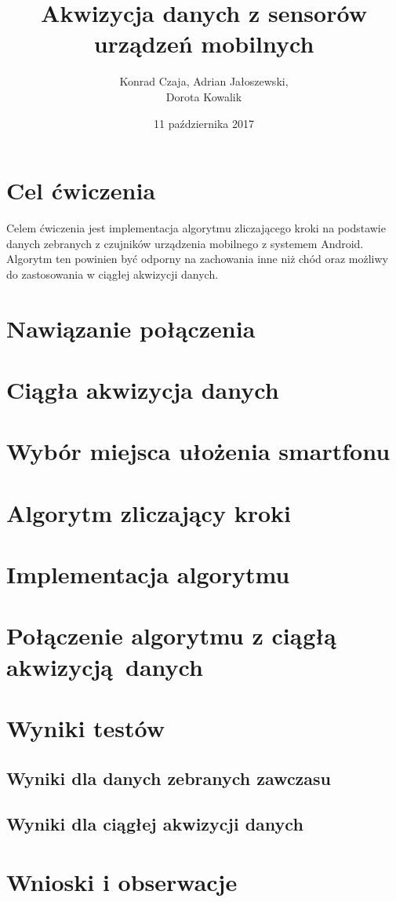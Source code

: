 \documentclass[a4paper, 12pt, titlepage]{article}
\author{Konrad Czaja, Adrian Jałoszewski,\\Dorota Kowalik}
\title{Akwizycja danych z sensorów urządzeń mobilnych}
\date{11 października 2017}
\begin{document}
    \maketitle
	\section{Cel ćwiczenia}
        Celem ćwiczenia jest implementacja algorytmu zliczającego kroki na
        podstawie danych zebranych z czujników urządzenia mobilnego z systemem
        Android. Algorytm ten powinien być odporny na zachowania inne niż chód
        oraz możliwy do zastosowania w ciągłej akwizycji danych.
    \section{Nawiązanie połączenia}

	\section{Ciągła akwizycja danych}
        
    \section{Wybór miejsca ułożenia smartfonu}
    \section{Algorytm zliczający kroki}
%            
    \section{Implementacja algorytmu}
        
    \section{Połączenie algorytmu z ciągłą akwizycją danych}   
        
    \section{Wyniki testów}
        \subsection{Wyniki dla danych zebranych zawczasu}
        \subsection{Wyniki dla ciągłej akwizycji danych}
    \section{Wnioski i obserwacje}
\end{document}
